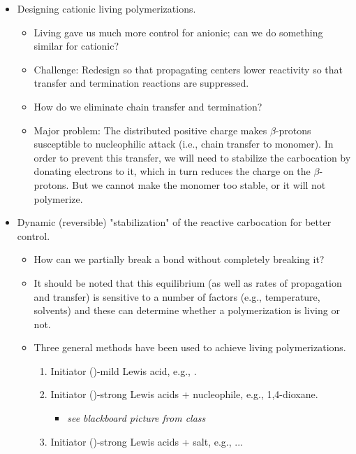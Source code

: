 \documentclass[../notes.tex]{subfiles}
\begin{document}
\begin{itemize}
\begin{itemize}
        \item Cationic rate of propagation is up to \num{e4} faster than radical rate of propagation.
    \end{itemize}
    \item Designing cationic living polymerizations.
    \begin{itemize}
        \item Living gave us much more control for anionic; can we do something similar for cationic?
        \item Challenge: Redesign so that propagating centers lower reactivity so that transfer and termination reactions are suppressed.
        \item How do we eliminate chain transfer and termination?
        \item Major problem: The distributed positive charge makes $\beta$-protons susceptible to nucleophilic attack (i.e., chain transfer to monomer). In order to prevent this transfer, we will need to stabilize the carbocation by donating electrons to it, which in turn reduces the charge on the $\beta$-protons. But we cannot make the monomer too stable, or it will not polymerize.
    \end{itemize}
    \item Dynamic (reversible) "stabilization" of the reactive carbocation for better control.
    \begin{itemize}
        \item How can we partially break a  bond without completely breaking it?
        \item It should be noted that this equilibrium (as well as rates of propagation and transfer) is sensitive to a number of factors (e.g., temperature, solvents) and these can determine whether a polymerization is living or not.
        \item Three general methods have been used to achieve living polymerizations.
        \begin{enumerate}
            \item Initiator ()-mild Lewis acid, e.g., .
            \item Initiator ()-strong Lewis acids + nucleophile, e.g., 1,4-dioxane.
            \begin{itemize}
                \item \emph{see blackboard picture from class}
            \end{itemize}
            \item Initiator ()-strong Lewis acids + salt, e.g., ...

\end{enumerate}
\end{itemize}
\end{itemize}
\end{document}
